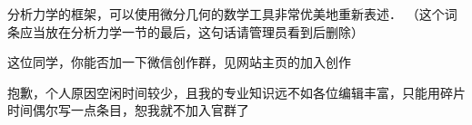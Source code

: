 分析力学的框架，可以使用微分几何的数学工具非常优美地重新表述．
（这个词条应当放在分析力学一节的最后，这句话请管理员看到后删除）

这位同学，你能否加一下微信创作群，见网站主页的加入创作

抱歉，个人原因空闲时间较少，且我的专业知识远不如各位编辑丰富，只能用碎片时间偶尔写一点条目，恕我就不加入官群了